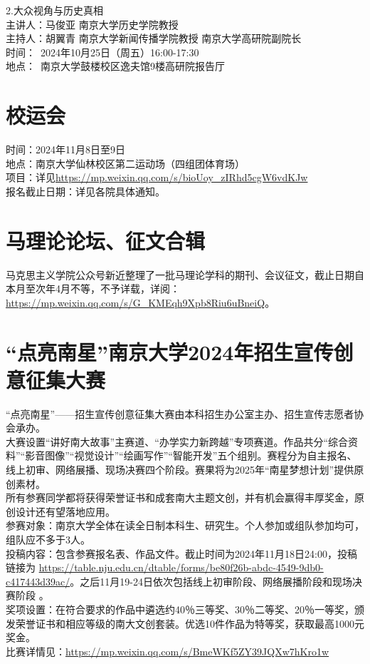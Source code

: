 \documentclass[letterpaper, 12pt]{article}
\begin{document}
\begin{multicols}{2}
2.大众视角与历史真相\\
主讲人：马俊亚 南京大学历史学院教授\\
主持人：胡翼青 南京大学新闻传播学院教授 南京大学高研院副院长\\
时间： 2024年10月25日（周五）16:00-17:30\\
地点： 南京大学鼓楼校区逸夫馆9楼高研院报告厅\\

\section{校运会}
时间：2024年11月8日至9日\\
地点：南京大学仙林校区第二运动场（四组团体育场）\\
项目：详见\url{https://mp.weixin.qq.com/s/bioUoy_zIRhd5cgW6vdKJw}\\
报名截止日期：详见各院具体通知。\\

\section{马理论论坛、征文合辑}
马克思主义学院公众号新近整理了一批马理论学科的期刊、会议征文，截止日期自本月至次年4月不等，不予详载，详阅：\url{https://mp.weixin.qq.com/s/G_KMEqh9Xpb8Riu6uBneiQ}。
\section{“点亮南星”南京大学2024年招生宣传创意征集大赛}
“点亮南星”——招生宣传创意征集大赛由本科招生办公室主办、招生宣传志愿者协会承办。\\
大赛设置“讲好南大故事”主赛道、“办学实力新跨越”专项赛道。作品共分“综合资料”“影音图像”“视觉设计”“绘画写作”“智能开发”五个组别。赛程分为自主报名、线上初审、网络展播、现场决赛四个阶段。赛果将为2025年“南星梦想计划”提供原创素材。\\
所有参赛同学都将获得荣誉证书和成套南大主题文创，并有机会赢得丰厚奖金，原创设计还有望落地应用。\\
参赛对象：南京大学全体在读全日制本科生、研究生。个人参加或组队参加均可，组队应不多于3人。\\
投稿内容：包含参赛报名表、作品文件。截止时间为2024年11月18日24:00，投稿链接为
\url{https://table.nju.edu.cn/dtable/forms/be80f26b-abdc-4549-9db0-c417443d39ac/}。之后11月19-24日依次包括线上初审阶段、网络展播阶段和现场决赛阶段
。\\
奖项设置：在符合要求的作品中遴选约40％三等奖、30％二等奖、20％一等奖，颁发荣誉证书和相应等级的南大文创套装。优选10件作品为特等奖，获取最高1000元奖金。\\
比赛详情见：\url{https://mp.weixin.qq.com/s/BmeWKf5ZY39JQXw7hKro1w}
\end{multicols} 
\end{document}
